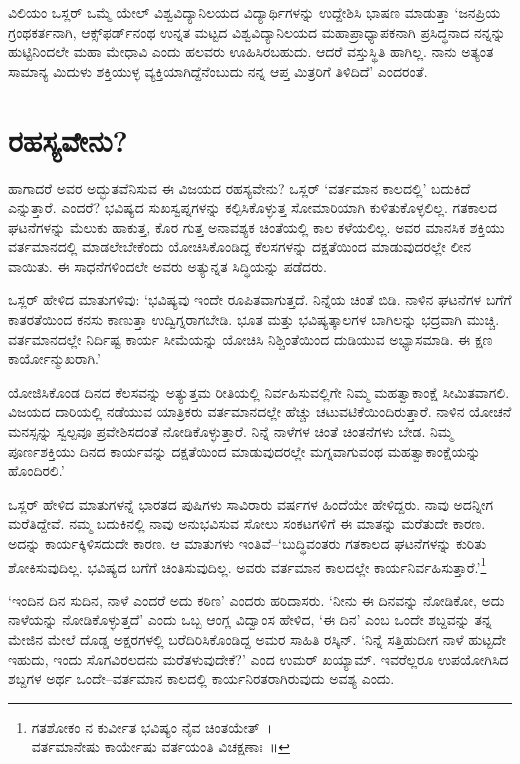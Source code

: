 \vskip 2pt

ವಿಲಿಯಂ ಒಸ್ಲರ್ ಒಮ್ಮೆ ಯೇಲ್ ವಿಶ್ವವಿದ್ಯಾನಿಲಯದ ವಿದ್ಯಾರ್ಥಿಗಳನ್ನು ಉದ್ದೇಶಿಸಿ ಭಾಷಣ ಮಾಡುತ್ತಾ ‘ಜನಪ್ರಿಯ ಗ್ರಂಥಕರ್ತನಾಗಿ, ಆಕ್ಸ್​ಫರ್ಡ್​ನಂಥ ಉನ್ನತ ಮಟ್ಟದ ವಿಶ್ವ\-ವಿದ್ಯಾ\-ನಿಲಯದ ಮಹಾಪ್ರಾಧ್ಯಾಪಕನಾಗಿ ಪ್ರಸಿದ್ಧನಾದ ನನ್ನನ್ನು ಹುಟ್ಟಿನಿಂದಲೇ ಮಹಾ ಮೇಧಾವಿ ಎಂದು ಹಲವರು ಊಹಿಸಿರಬಹುದು. ಆದರೆ ವಸ್ತುಸ್ಥಿತಿ ಹಾಗಿಲ್ಲ. ನಾನು ಅತ್ಯಂತ ಸಾಮಾನ್ಯ ಮಿದುಳು ಶಕ್ತಿಯುಳ್ಳ ವ್ಯಕ್ತಿಯಾಗಿದ್ದೆನೆಂಬುದು ನನ್ನ ಆಪ್ತ ಮಿತ್ರರಿಗೆ ತಿಳಿದಿದೆ’ ಎಂದರಂತೆ.


\section*{ರಹಸ್ಯವೇನು?}


ಹಾಗಾದರೆ ಅವರ ಅದ್ಭುತವೆನಿಸುವ ಈ ವಿಜಯದ ರಹಸ್ಯವೇನು? ಒಸ್ಲರ್ ‘ವರ್ತಮಾನ ಕಾಲದಲ್ಲಿ’ ಬದುಕಿದೆ ಎನ್ನುತ್ತಾರೆ. ಎಂದರೆ? ಭವಿಷ್ಯದ ಸುಖಸ್ವಪ್ನಗಳನ್ನು ಕಲ್ಪಿಸಿಕೊಳ್ಳುತ್ತ ಸೋಮಾರಿಯಾಗಿ ಕುಳಿತುಕೊಳ್ಳಲಿಲ್ಲ. ಗತಕಾಲದ ಘಟನೆಗಳನ್ನು ಮೆಲುಕು ಹಾಕುತ್ತ, ಕೊರ ಗುತ್ತ ಅನಾವಶ್ಯಕ ಚಿಂತೆಯಲ್ಲಿ ಕಾಲ ಕಳೆಯಲಿಲ್ಲ. ಅವರ ಮಾನಸಿಕ ಶಕ್ತಿಯು ವರ್ತಮಾನದಲ್ಲಿ ಮಾಡಲೇಬೇಕೆಂದು ಯೋಚಿಸಿಕೊಂಡಿದ್ದ ಕೆಲಸಗಳನ್ನು ದಕ್ಷತೆಯಿಂದ ಮಾಡುವುದರಲ್ಲೇ ಲೀನ ವಾಯಿತು. ಈ ಸಾಧನೆಗಳಿಂದಲೇ ಅವರು ಅತ್ಯುನ್ನತ ಸಿದ್ಧಿಯನ್ನು ಪಡೆದರು.

\vskip 2pt

ಒಸ್ಲರ್ ಹೇಳಿದ ಮಾತುಗಳಿವು: ‘ಭವಿಷ್ಯವು ಇಂದೇ ರೂಪಿತವಾಗುತ್ತದೆ. ನಿನ್ನೆಯ ಚಿಂತೆ ಬಿಡಿ. ನಾಳಿನ ಘಟನೆಗಳ ಬಗೆಗೆ ಕಾತರತೆಯಿಂದ ಕನಸು ಕಾಣುತ್ತಾ ಉದ್ವಿಗ್ನರಾಗಬೇಡಿ. ಭೂತ ಮತ್ತು ಭವಿಷ್ಯತ್ಕಾಲಗಳ ಬಾಗಿಲನ್ನು ಭದ್ರವಾಗಿ ಮುಚ್ಚಿ. ವರ್ತಮಾನದಲ್ಲೇ ನಿರ್ದಿಷ್ಟ ಕಾರ್ಯ ಸೀಮೆಯನ್ನು ಯೋಚಿಸಿ ನಿಶ್ಚಿಂತೆಯಿಂದ ದುಡಿಯುವ ಅಭ್ಯಾಸಮಾಡಿ. ಈ ಕ್ಷಣ ಕಾರ್ಯೋನ್ಮುಖರಾಗಿ.’

ಯೋಜಿಸಿಕೊಂಡ ದಿನದ ಕೆಲಸವನ್ನು ಅತ್ಯುತ್ತಮ ರೀತಿಯಲ್ಲಿ ನಿರ್ವಹಿಸುವಲ್ಲಿಗೇ ನಿಮ್ಮ ಮಹತ್ವಾಕಾಂಕ್ಷೆ ಸೀಮಿತವಾಗಲಿ. ವಿಜಯದ ದಾರಿಯಲ್ಲಿ ನಡೆಯುವ ಯಾತ್ರಿಕರು ವರ್ತಮಾನದಲ್ಲೇ ಹೆಚ್ಚು ಚಟುವಟಿಕೆಯಿಂದಿರುತ್ತಾರೆ. ನಾಳಿನ ಯೋಚನೆ ಮನಸ್ಸನ್ನು ಸ್ವಲ್ಪವೂ ಪ್ರವೇಶಿಸದಂತೆ ನೋಡಿಕೊಳ್ಳುತ್ತಾರೆ. ನಿನ್ನೆ ನಾಳೆಗಳ ಚಿಂತೆ ಚಿಂತನೆಗಳು ಬೇಡ. ನಿಮ್ಮ ಪೂರ್ಣಶಕ್ತಿಯು ದಿನದ ಕಾರ್ಯವನ್ನು ದಕ್ಷತೆಯಿಂದ ಮಾಡುವುದರಲ್ಲೇ ಮಗ್ನವಾಗುವಂಥ ಮಹತ್ವಾಕಾಂಕ್ಷೆಯನ್ನು ಹೊಂದಿರಲಿ.’

ಒಸ್ಲರ್ ಹೇಳಿದ ಮಾತುಗಳನ್ನೆ ಭಾರತದ ಪುಷಿಗಳು ಸಾವಿರಾರು ವರ್ಷಗಳ ಹಿಂದೆಯೇ ಹೇಳಿದ್ದರು. ನಾವು ಅದನ್ನೀಗ ಮರೆತಿದ್ದೇವೆ. ನಮ್ಮ ಬದುಕಿನಲ್ಲಿ ನಾವು ಅನುಭವಿಸುವ ಸೋಲು ಸಂಕಟಗಳಿಗೆ ಈ ಮಾತನ್ನು ಮರೆತುದೇ ಕಾರಣ. ಅದನ್ನು ಕಾರ್ಯಕ್ಕಿಳಿಸದುದೇ ಕಾರಣ. ಆ ಮಾತುಗಳು ಇಂತಿವೆ–‘ಬುದ್ಧಿವಂತರು ಗತಕಾಲದ ಘಟನೆಗಳನ್ನು ಕುರಿತು ಶೋಕಿಸುವುದಿಲ್ಲ. ಭವಿಷ್ಯದ ಬಗೆಗೆ ಚಿಂತಿಸುವುದಿಲ್ಲ. ಅವರು ವರ್ತಮಾನ ಕಾಲದಲ್ಲೇ ಕಾರ್ಯನಿರ್ವಹಿಸುತ್ತಾರೆ.’\footnote{ಗತಶೋಕಂ ನ ಕುರ್ವೀತ ಭವಿಷ್ಯಂ ನೈವ ಚಿಂತಯೇತ್~।\\\phantom{ವರ್ತ} ವರ್ತಮಾನೇಷು ಕಾರ್ಯೇಷು ವರ್ತಯಂತಿ ವಿಚಕ್ಷಣಾಃ~॥}

‘ಇಂದಿನ ದಿನ ಸುದಿನ, ನಾಳೆ ಎಂದರೆ ಅದು ಕಠಿಣ’ ಎಂದರು ಹರಿದಾಸರು. ‘ನೀನು ಈ ದಿನವನ್ನು ನೋಡಿಕೋ, ಅದು ನಾಳೆಯನ್ನು ನೋಡಿಕೊಳ್ಳುತ್ತದೆ’ ಎಂದು ಒಬ್ಬ ಆಂಗ್ಲ ವಿದ್ವಾಂಸ ಹೇಳಿದ, ‘ಈ ದಿನ’ ಎಂಬ ಒಂದೇ ಶಬ್ದವನ್ನು ತನ್ನ ಮೇಜಿನ ಮೇಲೆ ದೊಡ್ಡ ಅಕ್ಷರಗಳಲ್ಲಿ ಬರೆದಿರಿಸಿಕೊಂಡಿದ್ದ ಅಮರ ಸಾಹಿತಿ ರಸ್ಕಿನ್. ‘ನಿನ್ನೆ ಸತ್ತಿಹುದೀಗ ನಾಳೆ ಹುಟ್ಟದೇ ಇಹುದು, ಇಂದು ಸೊಗವಿರಲದನು ಮರೆತಳುವುದೇಕೆ?’ ಎಂದ ಉಮರ್ ಖಯ್ಯಾಮ್. ಇವರೆಲ್ಲರೂ ಉಪಯೋಗಿಸಿದ ಶಬ್ದಗಳ ಅರ್ಥ ಒಂದೇ–ವರ್ತಮಾನ ಕಾಲದಲ್ಲಿ ಕಾರ್ಯನಿರತರಾಗಿರುವುದು ಅವಶ್ಯ ಎಂದು.

